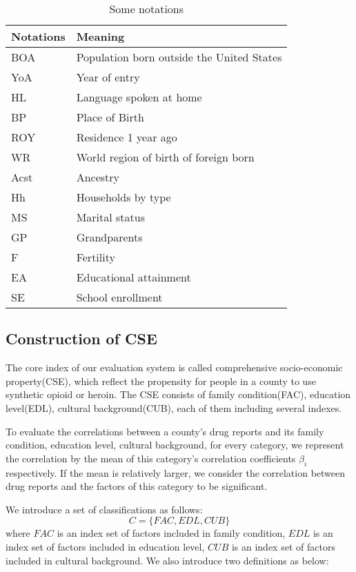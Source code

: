 \documentclass{mcmthesis}
\begin{document}
\begin{table}[!h]
\centering
\caption{Some notations} \label{tab:some notations}
\begin{tabular}{ll}
\toprule[2.5pt]
\textbf{Notations}& \textbf{Meaning} \\
\midrule[1.5pt]
 BOA   & Population born outside the United States    \\
 \midrule
 YoA & Year of entry   \\
 \midrule
 HL & Language spoken at home  \\
  \midrule
 BP & Place of Birth \\
  \midrule
 ROY & Residence 1 year ago \\
  \midrule
 WR & World region of birth of foreign born \\
  \midrule
Acst & Ancestry \\
 \midrule
Hh & Households by type \\
 \midrule
MS & Marital status \\
 \midrule
GP & Grandparents \\
 \midrule
F & Fertility \\
 \midrule
EA & Educational attainment \\
 \midrule
SE & School enrollment\\
\bottomrule
\end{tabular}
\end{table}



\subsection{Construction of CSE} 
The core index of our evaluation system is called comprehensive socio-economic property(CSE), which reflect the propensity for people in a county to use synthetic opioid or heroin. The CSE consists of family condition(FAC), education level(EDL), cultural background(CUB), each of them including several indexes. \par


To evaluate the correlations between a county’s drug reports and its family condition, education level, cultural background, for every category, we represent the correlation by the mean of this category’s correlation coefficients $\beta_i$  respectively. If the mean is relatively larger, we consider the correlation between drug reports and the factors of this category to be significant. \par
We introduce a set of classifications as follows:
  $$ C = \{FAC,EDL,CUB\}$$
  where $FAC$ is an index set of factors included in family condition, $EDL$ is an index set of factors included in education level, $CUB$ is an index set of factors included in cultural background.
  We also introduce two definitions as below:
\end{document}
